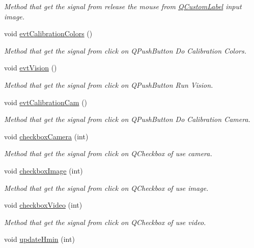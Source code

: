 \begin{DoxyCompactItemize}
\begin{DoxyCompactList}\small\item\em Method that get the signal from release the mouse from \hyperlink{classQCustomLabel}{Q\+Custom\+Label} input image. \end{DoxyCompactList}\item 
void \hyperlink{classMainWindow_a3f53a2549c74484b5d67d79914778c35}{evt\+Calibration\+Colors} ()
\begin{DoxyCompactList}\small\item\em Method that get the signal from click on Q\+Push\+Button Do Calibration Colors. \end{DoxyCompactList}\item 
void \hyperlink{classMainWindow_a202a597ababe8aa1fd3c821e703599b6}{evt\+Vision} ()
\begin{DoxyCompactList}\small\item\em Method that get the signal from click on Q\+Push\+Button Run Vision. \end{DoxyCompactList}\item 
void \hyperlink{classMainWindow_a774d98597bb682ed113f07a7068f6496}{evt\+Calibration\+Cam} ()
\begin{DoxyCompactList}\small\item\em Method that get the signal from click on Q\+Push\+Button Do Calibration Camera. \end{DoxyCompactList}\item 
void \hyperlink{classMainWindow_afb1276b4a282f8678e25b0ec1a0195c9}{checkbox\+Camera} (int)
\begin{DoxyCompactList}\small\item\em Method that get the signal from click on Q\+Checkbox of use camera. \end{DoxyCompactList}\item 
void \hyperlink{classMainWindow_aa0266c5762b37479a888fba709aefbee}{checkbox\+Image} (int)
\begin{DoxyCompactList}\small\item\em Method that get the signal from click on Q\+Checkbox of use image. \end{DoxyCompactList}\item 
void \hyperlink{classMainWindow_a33f858356490a2440246af76ca922392}{checkbox\+Video} (int)
\begin{DoxyCompactList}\small\item\em Method that get the signal from click on Q\+Checkbox of use video. \end{DoxyCompactList}\item 
void \hyperlink{classMainWindow_afffdad16c118e2351cec7b47c243e9b1}{update\+Hmin} (int)\hypertarget{classMainWindow_afffdad16c118e2351cec7b47c243e9b1}{}\label{classMainWindow_afffdad16c118e2351cec7b47c243e9b1}


\end{DoxyCompactItemize}

